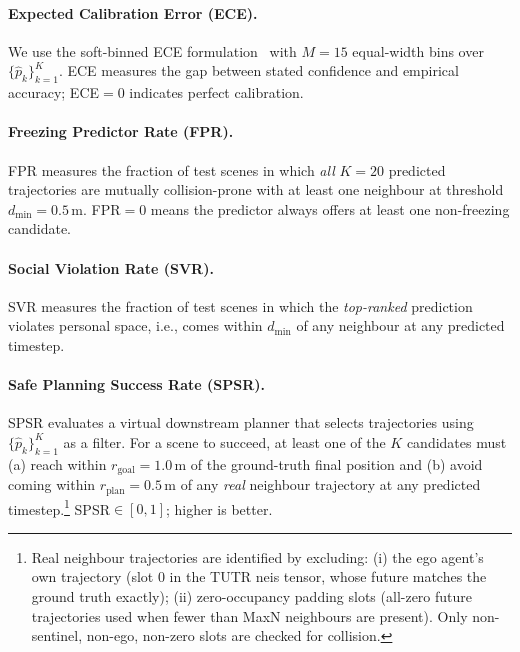 \documentclass{article}
\begin{document}
\paragraph{Expected Calibration Error (ECE).}
We use the soft-binned ECE formulation~\cite{karandikar2021soft} with
\(M=15\) equal-width bins over \(\{\hat{p}_k\}_{k=1}^{K}\). ECE measures
the gap between stated confidence and empirical accuracy; ECE\(=0\) indicates
perfect calibration.

\paragraph{Freezing Predictor Rate (FPR).}
FPR measures the fraction of test scenes in which \emph{all} \(K=20\)
predicted trajectories are mutually collision-prone with at least one
neighbour at threshold \(d_\text{min}=0.5\)\,m. FPR\(=0\) means the
predictor always offers at least one non-freezing candidate.

\paragraph{Social Violation Rate (SVR).}
SVR measures the fraction of test scenes in which the \emph{top-ranked}
prediction violates personal space, i.e., comes within \(d_\text{min}\) of
any neighbour at any predicted timestep.

\paragraph{Safe Planning Success Rate (SPSR).}
SPSR evaluates a virtual downstream planner that selects trajectories using
\(\{\hat{p}_k\}_{k=1}^{K}\) as a filter. For a scene to succeed, at least
one of the $K$ candidates must (a) reach within \(r_\text{goal}=1.0\)\,m of
the ground-truth final position and (b) avoid coming within
\(r_\text{plan}=0.5\)\,m of any \emph{real} neighbour trajectory at any
predicted timestep.\footnote{Real neighbour trajectories are identified by
excluding: (i) the ego agent's own trajectory (slot 0 in the TUTR neis
tensor, whose future matches the ground truth exactly); (ii) zero-occupancy
padding slots (all-zero future trajectories used when fewer than MaxN
neighbours are present). Only non-sentinel, non-ego, non-zero slots are
checked for collision.} SPSR\(\in[0,1]\); higher is better.

\end{document}
